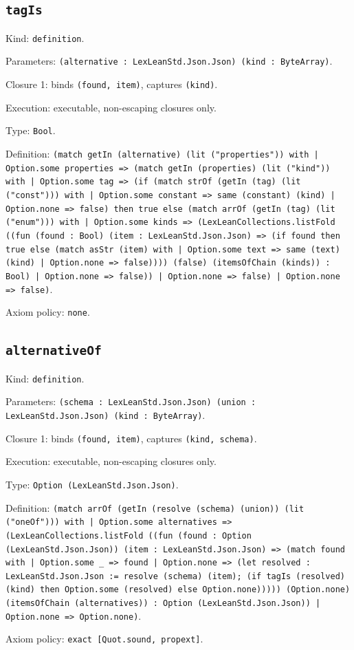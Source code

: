 \documentclass[11pt]{article}
\begin{document}
\subsection*{\texttt{tagIs}}
\noindent Kind: \texttt{definition}.\par
\noindent Parameters: \texttt{(alternative : LexLeanStd.Json.Json) (kind : ByteArray)}.\par
\noindent Closure 1: binds \texttt{(found, item)}, captures \texttt{(kind)}.\par
\noindent Execution: executable, non-escaping closures only.\par
\noindent Type: \texttt{Bool}.\par
\noindent Definition: \texttt{(match getIn (alternative) (lit ("properties")) with | Option.some properties => (match getIn (properties) (lit ("kind")) with | Option.some tag => (if (match strOf (getIn (tag) (lit ("const"))) with | Option.some constant => same (constant) (kind) | Option.none => false) then true else (match arrOf (getIn (tag) (lit ("enum"))) with | Option.some kinds => (LexLeanCollections.listFold ((fun (found : Bool) (item : LexLeanStd.Json.Json) => (if found then true else (match asStr (item) with | Option.some text => same (text) (kind) | Option.none => false)))) (false) (itemsOfChain (kinds)) : Bool) | Option.none => false)) | Option.none => false) | Option.none => false)}.\par
\noindent Axiom policy: \texttt{none}.\par
\subsection*{\texttt{alternativeOf}}
\noindent Kind: \texttt{definition}.\par
\noindent Parameters: \texttt{(schema : LexLeanStd.Json.Json) (union : LexLeanStd.Json.Json) (kind : ByteArray)}.\par
\noindent Closure 1: binds \texttt{(found, item)}, captures \texttt{(kind, schema)}.\par
\noindent Execution: executable, non-escaping closures only.\par
\noindent Type: \texttt{Option (LexLeanStd.Json.Json)}.\par
\noindent Definition: \texttt{(match arrOf (getIn (resolve (schema) (union)) (lit ("oneOf"))) with | Option.some alternatives => (LexLeanCollections.listFold ((fun (found : Option (LexLeanStd.Json.Json)) (item : LexLeanStd.Json.Json) => (match found with | Option.some \_ => found | Option.none => (let resolved : LexLeanStd.Json.Json := resolve (schema) (item); (if tagIs (resolved) (kind) then Option.some (resolved) else Option.none))))) (Option.none) (itemsOfChain (alternatives)) : Option (LexLeanStd.Json.Json)) | Option.none => Option.none)}.\par
\noindent Axiom policy: \texttt{exact [Quot.sound, propext]}.\par
\end{document}
